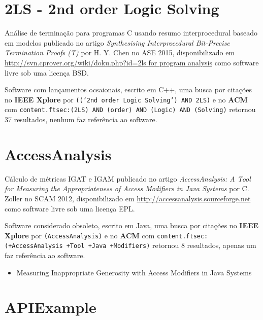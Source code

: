 

\label{softwares-summary}

\section{2LS - 2nd order Logic Solving}

Análise de terminação para programas C usando resumo interprocedural baseado em modelos
publicado no artigo {\it Synthesising Interprocedural Bit-Precise Termination Proofs (T)}
por H. Y. Chen
no ASE 2015,
disponibilizado em \url{http://svn.cprover.org/wiki/doku.php?id=2ls for program analysis}
como software livre
sob uma licença BSD.

Software com lançamentos ocsaionais,
escrito em C++,
uma busca por citações no {\bf IEEE Xplore} por
\texttt{(('2nd order Logic Solving') AND 2LS)}
e no {\bf ACM} com
\texttt{content.ftsec:(2LS) AND (order) AND (Logic) AND (Solving)}
retornou
37 resultados,
nenhum faz referência ao software.



\section{AccessAnalysis}

Cálculo de métricas IGAT e IGAM
publicado no artigo {\it AccessAnalysis: A Tool for Measuring the Appropriateness of Access Modifiers in Java Systems}
por C. Zoller
no SCAM 2012,
disponibilizado em \url{http://accessanalysis.sourceforge.net}
como software livre
sob uma licença EPL.

Software considerado obsoleto,
escrito em Java,
uma busca por citações no {\bf IEEE Xplore} por
\texttt{(AccessAnalysis)}
e no {\bf ACM} com
\texttt{content.ftsec:(+AccessAnalysis +Tool +Java +Modifiers)}
retornou
8 resultados,
apenas um faz referência ao software.

\begin{itemize}
\item Measuring Inappropriate Generosity with Access Modifiers in Java Systems
\end{itemize}


\section{APIExample}

